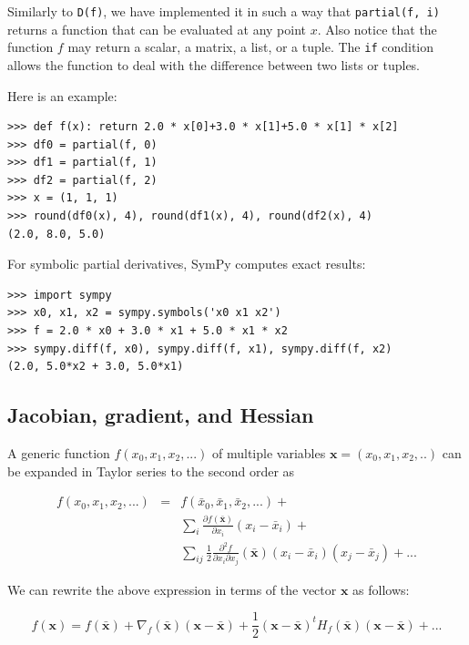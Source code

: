 \documentclass[justified, sixbynine]{tufte-book}
\def\ft{\small\tt}
\theoremstyle{plain}%
\newtheorem * {corollary}{Corollary}
\theoremstyle{definition}
\theoremstyle{remark}
\newtheorem * {remark}{Remark}
\newtheorem * {note}{Note}
\begin{document}
\begin{fullwidth}
Similarly to {\ft D(f)}, we have implemented it in such a way that {\ft partial(f, i)} returns a function that can be evaluated at any point $x$. Also notice that the function $f$ may return a scalar, a matrix, a list, or a tuple. The {\ft if} condition allows the function to deal with the difference between two lists or tuples.

Here is an example:

\begin{lstlisting}[caption={in file: {\ft nlib.py}}]
>>> def f(x): return 2.0 * x[0]+3.0 * x[1]+5.0 * x[1] * x[2]
>>> df0 = partial(f, 0)
>>> df1 = partial(f, 1)
>>> df2 = partial(f, 2)
>>> x = (1, 1, 1)
>>> round(df0(x), 4), round(df1(x), 4), round(df2(x), 4)
(2.0, 8.0, 5.0)
\end{lstlisting}

For symbolic partial derivatives, SymPy computes exact results:

\begin{lstlisting}
>>> import sympy
>>> x0, x1, x2 = sympy.symbols('x0 x1 x2')
>>> f = 2.0 * x0 + 3.0 * x1 + 5.0 * x1 * x2
>>> sympy.diff(f, x0), sympy.diff(f, x1), sympy.diff(f, x2)
(2.0, 5.0*x2 + 3.0, 5.0*x1)
\end{lstlisting}

\goodbreak\subsection{Jacobian, gradient, and Hessian}


A generic function $f(x_0, x_1, x_2, ...)$ of multiple variables $\mathbf{x}=(x_0, x_1, x_2, ..)$ can be expanded in Taylor series to the second order as

\begin{eqnarray}
f(x_0, x_1, x_2, ...) &=& f(\bar x_0, \bar x_1, \bar x_2, ...) + \\
&& \sum_i \frac{\partial f(\mathbf{\bar x})}{\partial x_i}(x_i-\bar x_i) + \\
&& \sum_{ij} \frac12 \frac{\partial^2 f}{\partial x_i\partial x_j}(\mathbf{\bar x})(x_i-\bar x_i)(x_j-\bar x_j) + ...
\end{eqnarray}

We can rewrite the above expression in terms of the vector $\mathbf{x}$ as follows:

\begin{equation}
f(\mathbf{x}) = f(\mathbf{\bar x}) + \nabla_f(\mathbf{\bar x})(\mathbf{x}-\mathbf{\bar x})
+ \frac12 (\mathbf{x}-\mathbf{\bar x})^t H_f(\mathbf{\bar x})(\mathbf{x}-\mathbf{\bar x}) + ...
\end{equation}


\end{fullwidth}
\end{document}
